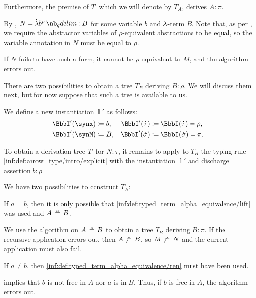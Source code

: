\begin{algorithm}
\begin{thmenum}
    Furthermore, the premise of \( T \), which we will denote by \( T_A \), derives \( A: \pi \).

    By , \( N = \qabs {b^\rho} B \) for some variable \( b \) and \( {\mathrm \lambda} \)-term \( B \). Note that, as per , we require the abstractor variables of \( \rho \)-equivalent abstractions to be equal, so the variable annotation in \( N \) must be equal to \( \rho \).

    If \( N \) fails to have such a form, it cannot be \( \rho \)-equivalent to \( M \), and the algorithm errors out.

    There are two possibilities to obtain a tree \( T_B \) deriving \( B: \rho \). We will discuss them next, but for now suppose that such a tree is available to us.

    We define a new instantiation \( \BbbI' \) as follows:
    \begin{align*}
      \BbbI'(\synx) &\coloneqq b, &\BbbI'(\syn\tau) &\coloneqq \BbbI(\syn\tau) = \rho, \\
      \BbbI'(\synM) &\coloneqq B, &\BbbI'(\syn\sigma) &\coloneqq \BbbI(\syn\sigma) = \pi.
    \end{align*}

    To obtain a derivation tree \( T' \) for \( N: \tau \), it remains to apply to \( T_B \) the typing rule \ref{inf:def:arrow_type/intro/explicit} with the instantiation \( \BbbI' \) and discharge assertion \( b: \rho \)

    We have two possibilities to construct \( T_B \):
    \begin{thmenum}
       If \( a = b \), then it is only possible that \ref{inf:def:typed_term_alpha_equivalence/lift} was used and \( A \aequiv B \).

      We use the algorithm on \( A \aequiv B \) to obtain a tree \( T_B \) deriving \( B: \pi \). If the recursive application errors out, then \( A \not\aequiv B \), so \( M \not\aequiv N \) and the current application must also fail.

       If \( a \neq b \), then \ref{inf:def:typed_term_alpha_equivalence/ren} must have been used.

       implies that \( b \) is not free in \( A \) nor \( a \) is in \( B \). Thus, if \( b \) is free in \( A \), the algorithm errors out.


\end{thmenum}
\end{thmenum}
\end{algorithm}
